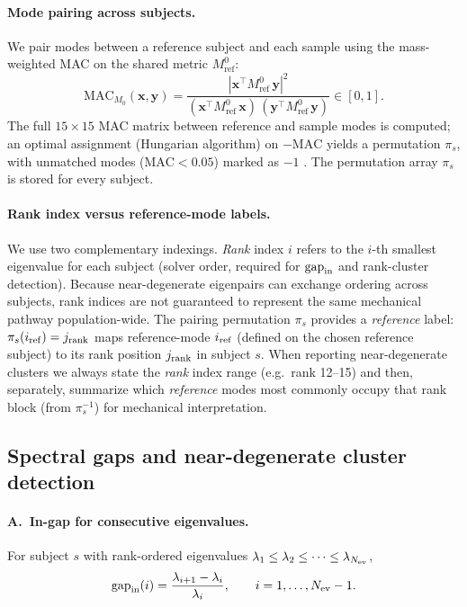 \documentclass[11pt]{article}
\begin{document}
\paragraph{Mode pairing across subjects.}
We pair modes between a reference subject and each sample using the mass-weighted MAC on the shared metric $M_{\mathrm{ref}}^{0}$:
\begin{equation}\label{eq:mac}
\mathrm{MAC}_{M_0}(\mathbf x,\mathbf y)
=\frac{|\mathbf x^\top M_{\mathrm{ref}}^{0}\,\mathbf y|^2}
     {(\mathbf x^\top M_{\mathrm{ref}}^{0}\,\mathbf x)\,
      (\mathbf y^\top M_{\mathrm{ref}}^{0}\,\mathbf y)}
\in[0,1].
\end{equation}
The full $15{\times}15$ MAC matrix between reference and sample modes is computed; an optimal assignment (Hungarian algorithm) on $-\mathrm{MAC}$ yields a permutation $\pi_s$, with unmatched modes ($\mathrm{MAC}<0.05$) marked as $-1$ \citep{Kuhn1955Hungarian}.
The permutation array $\pi_s$ is stored for every subject.

\paragraph{Rank index versus reference-mode labels.}
We use two complementary indexings.
\emph{Rank} index $i$ refers to the $i$-th smallest eigenvalue for each subject (solver order, required for $\mathrm{gap}_{\rm in}$ and rank-cluster detection).
Because near-degenerate eigenpairs can exchange ordering across subjects, rank indices are not guaranteed to represent the same mechanical pathway population-wide.
The pairing permutation $\pi_s$ provides a \emph{reference} label: $\pi_s(i_{\rm ref})=j_{\rm rank}$ maps reference-mode $i_{\rm ref}$ (defined on the chosen reference subject) to its rank position $j_{\rm rank}$ in subject $s$.
When reporting near-degenerate clusters we always state the \emph{rank} index range (e.g.\ rank 12--15) and then, separately, summarize which \emph{reference} modes most commonly occupy that rank block (from $\pi_s^{-1}$) for mechanical interpretation.

\subsection{Spectral gaps and near-degenerate cluster detection}
\label{sec:gaps}

\paragraph{A.\ In-gap for consecutive eigenvalues.}
For subject $s$ with rank-ordered eigenvalues $\lambda_1\le\lambda_2\le\cdots\le\lambda_{N_{\rm ev}}$,
\begin{equation}\label{eq:gap-in}
\mathrm{gap}_{\rm in}(i) = \frac{\lambda_{i+1}-\lambda_i}{\lambda_i},
\qquad i=1,\ldots,N_{\rm ev}-1.
\end{equation}
\end{document}
